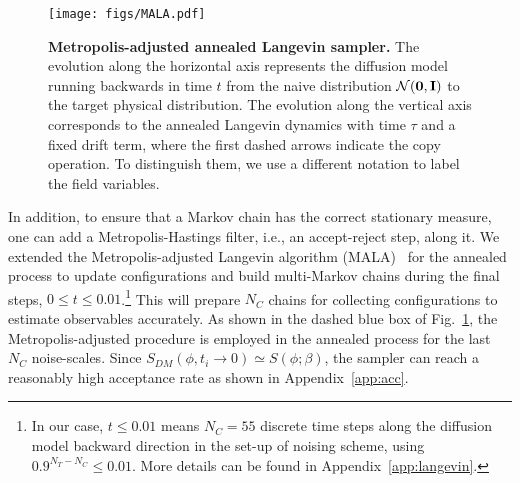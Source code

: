 \documentclass[a4paper,11pt]{article}
\begin{document}
\begin{figure}[hbtp!]
\begin{center}
    \texttt{[image: figs/MALA.pdf]}
\end{center}
\caption{\textbf{Metropolis-adjusted annealed Langevin sampler.} The evolution along the horizontal axis represents the diffusion model running backwards in time $t$ from the naive distribution $\mathcal{N}({\bf0, I})$ to the target physical distribution. The evolution along the vertical axis corresponds to the annealed Langevin dynamics with time $\tau$ and a fixed drift term, where the first dashed arrows indicate the copy operation. To distinguish them, we use a different notation to label the field variables.}
\label{fig:mala}
\end{figure}

In addition, to ensure that a Markov chain has the correct stationary measure, one can add a Metropolis-Hastings filter, i.e., an accept-reject step, along it. We extended the Metropolis-adjusted Langevin algorithm (MALA)~\cite{roberts1998optimal,girolami2011riemann} for the annealed process to update configurations and build multi-Markov chains during the final steps, $0\leq t \leq 0.01$.\footnote{In our case, $t\leq 0.01$ means $N_C= 55$ discrete time steps along the diffusion model backward direction in the set-up of noising scheme, using $0.9^{N_T-N_C}\leq 0.01$. More details can be found in Appendix~\ref{app:langevin}.} This will prepare $N_C$ chains for collecting configurations to estimate observables accurately. As shown in the dashed blue box of Fig.~\ref{fig:mala}, the Metropolis-adjusted procedure is employed in the annealed process for the last $N_C$ noise-scales. Since $S_{DM}(\phi,t_i \rightarrow 0) \simeq S(\phi;\beta)$, the sampler can reach a reasonably high acceptance rate as shown in Appendix~\ref{app:acc}.
\end{document}
